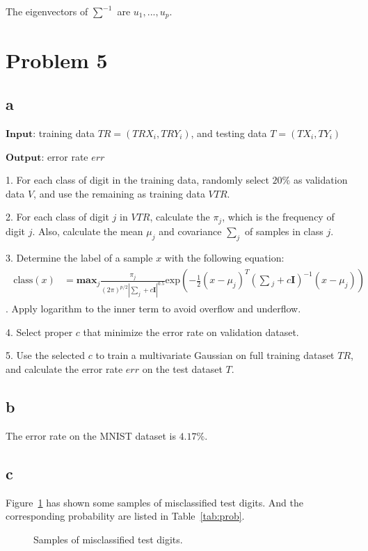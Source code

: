 \documentclass[a4paper,11pt]{article}
\theoremstyle{mytheor}
\begin{document}
The eigenvectors of $\sum^{-1}$ are $u_1, ..., u_p$.

\section*{Problem 5}
\subsection*{a}

$\mathbf{Input}$: training data $TR = (TRX_i, TRY_i)$, and testing data $T = (TX_i, TY_i)$

$\mathbf{Output}$: error rate $err$

1. For each class of digit in the training data, randomly select $20\%$ as validation data $V$, and use the remaining as training data $VTR$.

2. For each class of digit $j$ in $VTR$, calculate the $\pi_j$, which is the frequency of digit $j$. Also, calculate the mean $\mu_j$ and covariance $\sum_{j}$ of samples in class $j$.

3. Determine the label of a sample $x$ with the following equation:
\begin{align}
	\begin{split}
	\text{class}(x) &= \mathbf{max}_{j} \frac{\pi_j}{(2\pi)^{p/2} |\sum_j + c\mathbf{I}|^{0.5}}
	\text{exp}(-\frac{1}{2} (x - \mu_j)^T (\sum{}_j + c\mathbf{I})^{-1} (x - \mu_j))
	\end{split}
\end{align}.
Apply logarithm to the inner term to avoid overflow and underflow.

4. Select proper $c$ that minimize the error rate on validation dataset.

5. Use the selected $c$ to train a multivariate Gaussian on full training dataset $TR$, and calculate the error rate $err$ on the test dataset $T$.

\subsection*{b}
The error rate on the MNIST dataset is $4.17\%$.

\subsection*{c}
Figure~\ref{fig:wrong} has shown some samples of misclassified test digits. And the corresponding probability are listed in Table~\ref{tab:prob}.
\begin{figure}[h]
	\caption{Samples of misclassified test digits.}
	\label{fig:wrong}
\end{figure}
\end{document}
